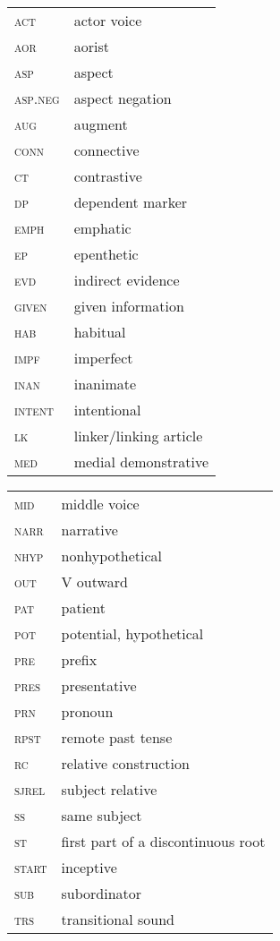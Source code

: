\documentclass[output=paper,colorlinks,citecolor=brown]{langscibook}
\begin{document}
\begin{tabularx}{.45\textwidth}{lQ}
\textsc{act} & actor voice\\
\textsc{aor} & aorist\\
\textsc{asp} & aspect\\
\textsc{asp.neg} & aspect negation\\
\textsc{aug} & augment\\
\textsc{conn} & connective \\
\textsc{ct} & contrastive\\
\textsc{dp} & dependent marker\\
\textsc{emph} & emphatic\\
\textsc{ep} & epenthetic\\
\textsc{evd} & indirect evidence\\
\textsc{given} & given information\\
\textsc{hab} & habitual\\
\textsc{impf} & imperfect\\
\textsc{inan} & inanimate\\
\textsc{intent} &  intentional\\
\textsc{lk} & linker/linking article\\
\textsc{med} & medial demonstrative\\
\end{tabularx}
\begin{tabularx}{.45\textwidth}{lQ}
\textsc{mid} & middle voice\\
\textsc{narr} & narrative\\
\textsc{nhyp} & nonhypothetical\\
\textsc{out} & V outward\\
\textsc{pat} & patient\\
\textsc{pot} & potential, hypothetical\\
\textsc{pre} & prefix\\
\textsc{pres} & presentative\\
\textsc{prn} & pronoun\\
\textsc{rpst} & remote past tense\\
\textsc{rc} & relative construction\\
\textsc{sjrel} & subject relative\\
\textsc{ss} &  same subject\\
\textsc{st} & first part of a discontinuous root\\
\textsc{start} & inceptive\\
\textsc{sub} & subordinator\\
\textsc{trs} & transitional sound 
\end{tabularx}
\end{document}
